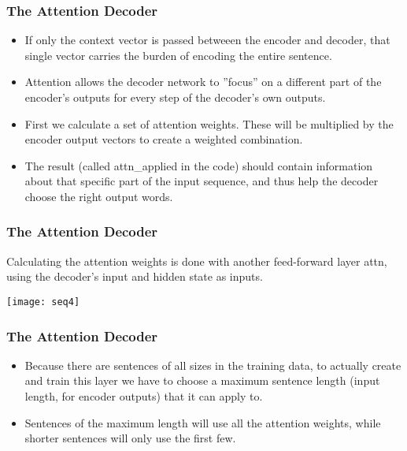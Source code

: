 \begin{frame}[fragile]
\frametitle{The Attention Decoder}

\begin{itemize}
\item If only the context vector is passed betweeen the encoder and decoder, that single vector carries the burden of encoding the entire sentence.
\item Attention allows the decoder network to ''focus'' on a different part of the encoder's outputs for every step of the decoder's own outputs.
\item First we calculate a set of attention weights. These will be multiplied by the encoder output vectors to create a weighted combination. 
\item The result (called attn\_applied in the code) should contain information about that specific part of the input sequence, and thus help the decoder choose the right output words.
\end{itemize}
        
\end{frame} 


\begin{frame}[fragile]
\frametitle{The Attention Decoder}

Calculating the attention weights is done with another feed-forward layer attn, using the decoder's input and hidden state as inputs. 

\begin{center}
\texttt{[image: seq4]}
\end{center}           
\end{frame} 


\begin{frame}[fragile]
\frametitle{The Attention Decoder}

\begin{itemize}
\item Because there are sentences of all sizes in the training data, to actually create and train this layer we have to choose a maximum sentence length (input length, for encoder outputs) that it can apply to. 
\item Sentences of the maximum length will use all the attention weights, while shorter sentences will only use the first few.
\end{itemize}
        
\end{frame} 

